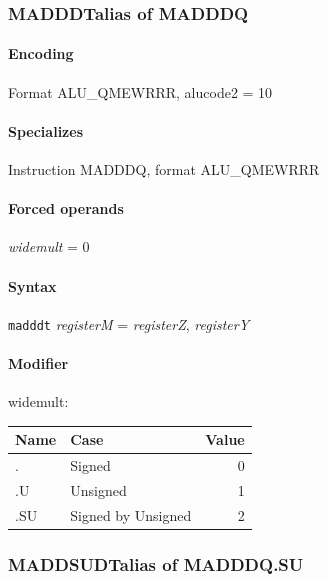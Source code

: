 {\subsubsection[{\small MADDDT: alias of MADDDQ}]{MADDDT\hfill alias of MADDDQ}
\label{instr:MADDDT}

\paragraph{Encoding} Format \textsf{ALU\_QMEWRRR, alucode2 = 10}\\



\paragraph{Specializes} Instruction MADDDQ, format ALU\_QMEWRRR

\paragraph{Forced operands} \emph{widemult} = 0

\paragraph{Syntax} \texttt{madddt} \emph{registerM} = \emph{registerZ}, \emph{registerY}

\paragraph{Modifier} \textsf{widemult}:\\

\noindent \begin{tabular}{|l|l|r|} \hline
\bf{Name} & \bf{Case} & \bf{Value} \\ \hline
. & Signed & 0 \\
.U & Unsigned & 1 \\
.SU & Signed by Unsigned & 2 \\
\hline \end{tabular}
\newpage
\subsubsection[{\small MADDSUDT: alias of MADDDQ.SU}]{MADDSUDT\hfill alias of MADDDQ.SU}
\label{instr:MADDSUDT}

}
